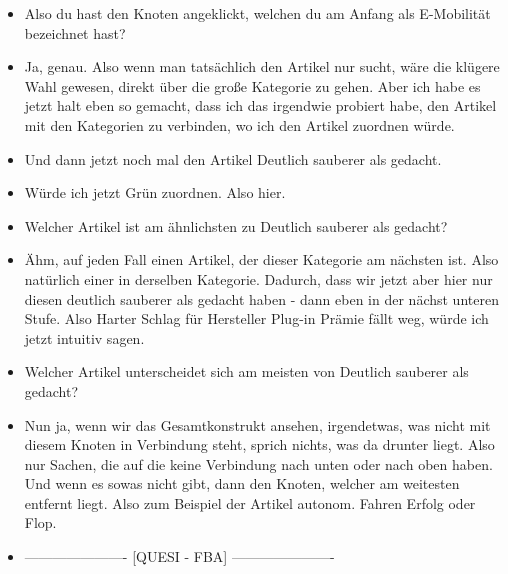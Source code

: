 {\begin{itemize}[]
                  Aber ich glaube, das wird wahrscheinlich hierunter gelistet sein.
                  Hoffe ich jetzt zumindest.
                  Nö, eben nicht.
                  Unlucky.
                  Also ich wollte es jetzt so spezifisch wie möglich machen.
                  Ich könnte natürlich auch hier lang, also den Knoten anklicken und dann schauen, wo der Artikel ist.
            \item {} Also du hast den Knoten angeklickt, welchen du am Anfang als E-Mobilität bezeichnet hast?
            \item {} Ja, genau.
                  Also wenn man tatsächlich den Artikel nur sucht, wäre die klügere Wahl gewesen, direkt über die große Kategorie zu gehen.
                  Aber ich habe es jetzt halt eben so gemacht, dass ich das irgendwie probiert habe, den Artikel mit den Kategorien zu verbinden, wo ich den Artikel zuordnen würde.
            \item {} Und dann jetzt noch mal den Artikel \flqq Deutlich sauberer als gedacht\frqq{}.
            \item {} Würde ich jetzt Grün zuordnen. Also hier.
            \item {} Welcher Artikel ist am ähnlichsten zu \flqq Deutlich sauberer als gedacht\frqq{}?
            \item {} Ähm, auf jeden Fall einen Artikel, der dieser Kategorie am nächsten ist.
                  Also natürlich einer in derselben Kategorie.
                  Dadurch, dass wir jetzt aber hier nur diesen deutlich sauberer als gedacht haben - dann eben in der nächst unteren Stufe.
                  Also \flqq Harter Schlag für Hersteller Plug-in Prämie fällt weg\frqq{}, würde ich jetzt intuitiv sagen.
            \item {} Welcher Artikel unterscheidet sich am meisten von \flqq Deutlich sauberer als gedacht\frqq{}?
            \item {} Nun ja, wenn wir das Gesamtkonstrukt ansehen, irgendetwas, was nicht mit diesem Knoten in Verbindung steht, sprich nichts, was da drunter liegt.
                  Also nur Sachen, die auf die keine Verbindung nach unten oder nach oben haben.
                  Und wenn es sowas nicht gibt, dann den Knoten, welcher am weitesten entfernt liegt.
                  Also zum Beispiel der Artikel \flqq autonom. Fahren Erfolg oder Flop\frqq{}.
            \item {----------------------} [QUESI - FBA] {----------------------}

\end{itemize}}
